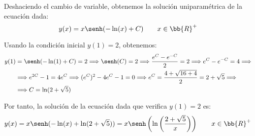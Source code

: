 \begin{ejercicio}
    Deshaciendo el cambio de variable, obtenemos la solución uniparamétrica de la ecuación dada:
    \begin{equation*}
        y(x) = x\senh(-\ln(x) + C) \qquad x\in \bb{R}^+
    \end{equation*}

    Usando la condición inicial $y(1)=2$, obtenemos:
    \begin{align*}
        y(1) &= \senh(-\ln(1) + C) = 2 \Longrightarrow \senh(C) = 2 \Longrightarrow \dfrac{e^C-e^{-C}}{2} = 2 \Longrightarrow e^C-e^{-C} = 4 \Longrightarrow\\&\Longrightarrow e^{2C}-1 = 4e^C \Longrightarrow (e^C)^2-4e^C-1 = 0 \Longrightarrow e^C = \dfrac{4+ \sqrt{16+4}}{2} = 2+ \sqrt{5} \Longrightarrow\\&\Longrightarrow C = \ln(2+ \sqrt{5})
    \end{align*}

    Por tanto, la solución de la ecuación dada que verifica $y(1)=2$ es:
    \begin{equation*}
        y(x) = x\senh(-\ln(x) + \ln(2+ \sqrt{5})) = x\senh\left(\ln\left(\dfrac{2+ \sqrt{5}}{x}\right)\right) \qquad x\in \bb{R}^+
    \end{equation*}
\end{ejercicio}


